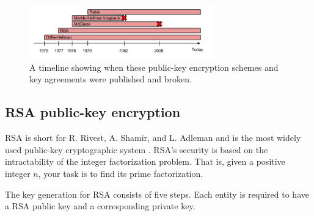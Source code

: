 \documentclass[frame, english]{idamasterthesis}
\begin{document}
\begin{figure}[h!]      %
    \centering
    \includegraphics[width=80mm]{Pics/timeLineUsage.png}
    \caption{A timeline showing when these public-key encryption schemes and key agreements were published and broken. }
    \label{usagetimeline}
\end{figure}

\subsection{RSA public-key encryption}
RSA is short for R. Rivest, A. Shamir, and L. Adleman and is the most widely used public-key cryptographic system \cite{handcrypt}. RSA's security is based on the intractability of the integer factorization problem. That is, given a positive integer $n$, your task is to find its prime factorization.

\pagebreak

\noindent The key generation for RSA consists of five steps. Each entity is required to have a RSA public key and a corresponding private key. 
    
\end{document}
